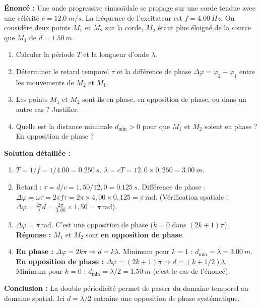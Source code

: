 \documentclass[11pt]{article}
\begin{document}
\begin{exoresolu}
\textbf{Énoncé :} Une onde progressive sinusoïdale se propage sur une corde tendue avec une célérité $c = \SI{12,0}{m/s}$. La fréquence de l'excitateur est $f = \SI{4,00}{Hz}$. On considère deux points $M_1$ et $M_2$ sur la corde, $M_2$ étant plus éloigné de la source que $M_1$ de $d = \SI{1,50}{m}$.
\begin{enumerate}
    \item Calculer la période $T$ et la longueur d'onde $\lambda$.
    \item Déterminer le retard temporel $\tau$ et la différence de phase $\Delta \varphi = \varphi_2 - \varphi_1$ entre les mouvements de $M_2$ et $M_1$.
    \item Les points $M_1$ et $M_2$ sont-ils en phase, en opposition de phase, ou dans un autre cas ? Justifier.
    \item Quelle est la distance minimale $d_{\text{min}} > 0$ pour que $M_1$ et $M_2$ soient en phase ? En opposition de phase ?
\end{enumerate}
\tcblower
\textbf{Solution détaillée :}
\begin{enumerate}
    \item $T = 1/f = 1/\num{4,00} = \SI{0,250}{s}$. $\lambda = c T = 12,0 \times 0,250 = \boxed{\SI{3,00}{m}}$.
    \item Retard : $\tau = d/c = 1,50 / 12,0 = \SI{0,125}{s}$.
    Différence de phase : $\Delta \varphi = \omega \tau = 2\pi f \tau = 2\pi \times 4,00 \times 0,125 = \pi\,\text{rad}$.
    (Vérification spatiale : $\Delta \varphi = \frac{2\pi}{\lambda}d = \frac{2\pi}{3,00} \times 1,50 = \pi\,\text{rad}$).
    \item $\Delta \varphi = \pi\,\text{rad}$. C'est une opposition de phase ($k=0$ dans $(2k+1)\pi$).
    \textbf{Réponse :} $M_1$ et $M_2$ sont \textbf{en opposition de phase}.
    \item \textbf{En phase :} $\Delta \varphi = 2k\pi \Rightarrow d = k\lambda$. Minimum pour $k=1$ : $d_{\text{min}} = \lambda = \boxed{\SI{3,00}{m}}$.
    \textbf{En opposition de phase :} $\Delta \varphi = (2k+1)\pi \Rightarrow d = (k+1/2)\lambda$. Minimum pour $k=0$ : $d_{\text{min}} = \lambda/2 = \boxed{\SI{1,50}{m}}$ (c'est le cas de l'énoncé).
\end{enumerate}
\textbf{Conclusion :} La double périodicité permet de passer du domaine temporel au domaine spatial. Ici $d = \lambda/2$ entraîne une opposition de phase systématique.
\end{exoresolu}
\end{document}
